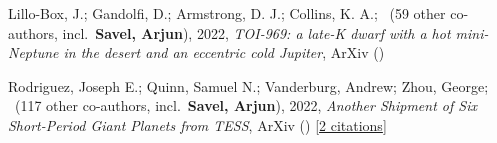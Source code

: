 \item[{\color{numcolor}\scriptsize2}] Lillo-Box, J.; Gandolfi, D.; Armstrong, D. J.; Collins, K. A.; \etal\ ({59} other co-authors, incl.\ \textbf{Savel, Arjun}), 2022, \emph{TOI-969: a late-K dwarf with a hot mini-Neptune in the desert and an eccentric cold Jupiter}, ArXiv ()

\item[{\color{numcolor}\scriptsize1}] Rodriguez, Joseph E.; Quinn, Samuel N.; Vanderburg, Andrew; Zhou, George; \etal\ ({117} other co-authors, incl.\ \textbf{Savel, Arjun}), 2022, \emph{Another Shipment of Six Short-Period Giant Planets from TESS}, ArXiv () [\href{https://ui.adsabs.harvard.edu/abs/2022arXiv220505709R}{2 citations}]